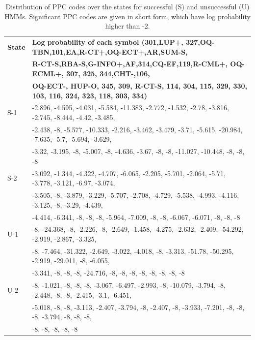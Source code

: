 \documentclass{amia}
\begin{document}
\begin{table}[h]
\centering
\caption{Distribution of PPC codes over the states for successful (S) and unsuccessful (U) HMMs. Significant PPC codes are given in short form, which have log probability higher than -2.}
\label{tab:emission_matrix}
  \begin{tabular}{|l|l|}
  \hline
   \textbf{State} & \textbf{Log probability of each symbol (301,LUP+, 327,OQ-TBN,101,EA,R-CT+,OQ-ECT+,AR,SUM-S,} \\ 
   \textbf{} & \textbf{R-CT-S,RBA-S,G-INFO+,AF,314,CQ-EF,119,R-CML+, OQ-ECML+, 307, 325, 344,CHT-,106,} \\
    & \textbf{OQ-ECT-, HUP-O, 345, 309, R-CT-S, 114, 304, 115, 329, 330, 103, 116, 324, 323, 118, 303, 334)} \\\hline      
S-1 & -2.896, -4.595, -4.031, -5.584, -11.383, -2.772, -1.532, -2.78, -3.816, -2.745, -8.444, -4.42, -3.485, \\
& -2.438, -8, -5.577, -10.333, -2.216, -3.462, -3.479, -3.71, -5.615, -20.984, -7.635, -5.7, -5.694, -3.629, \\
& -3.32, -3.195, -8, -5.007, -8, -4.636, -3.67, -8, -8, -11.027, -10.448, -8, -8, -8 \\\hline
S-2 & -3.092, -1.344, -4.322, -4.707, -6.065, -2.205, -5.701, -2.064, -5.71, -3.778, -3.121, -6.97, -3.074, \\
& -3.505, -8, -3.879, -3.229, -5.707, -2.708, -4.729, -5.538, -4.993, -4.116, -3.125, -8, -3.29, -4.439, \\
& -4.414, -6.341, -8, -8, -8, -5.964, -7.009, -8, -8, -6.067, -6.071, -8, -8, -8 \\\hline

U-1 & -8, -24.368, -8, -2.226, -8, -2.649, -1.458, -4.275, -2.632, -2.409, -54.292, -2.919, -2.867, -3.325, \\
& -8, -7.464, -31.322, -2.649, -3.022, -4.018, -8, -3.313, -51.78, -50.295, -2.919, -29.011, -8, -6.055, \\
& -3.341, -8, -8, -8, -24.716, -8, -8, -8, -8, -8, -8, -8, -8  \\\hline
U-2 & -8, -1.021, -8, -8, -8, -3.067, -6.497, -2.993, -8, -10.079, -3.794, -8, -2.448, -8, -8, -2.415, -3.1, -6.451, \\
& -5.018, -8, -8, -3.113, -2.407, -3.794, -8, -2.407, -8, -3.933, -7.201, -8, -8, -8, -3.794, -8, -8, -8, \\
& -8, -8, -8, -8, -8 \\\hline
  \end{tabular}
\end{table} 
\end{document}
